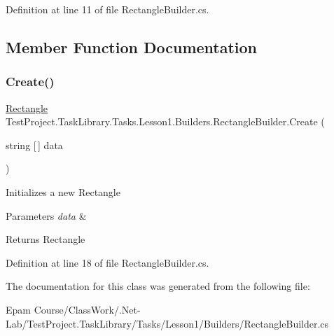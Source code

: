 Definition at line 11 of file Rectangle\+Builder.\+cs.



\subsection{Member Function Documentation}
\mbox{\label{class_test_project_1_1_task_library_1_1_tasks_1_1_lesson1_1_1_builders_1_1_rectangle_builder_af15f46e36e73a3d2f718ceb2856a2377}} 
\subsubsection{\texorpdfstring{Create()}{Create()}}
{\footnotesize\ttfamily \mbox{\hyperlink{class_test_project_1_1_task_library_1_1_tasks_1_1_lesson1_1_1_models_1_1_rectangle}{Rectangle}} Test\+Project.\+Task\+Library.\+Tasks.\+Lesson1.\+Builders.\+Rectangle\+Builder.\+Create (\begin{DoxyParamCaption}\item[{string \mbox{[}$\,$\mbox{]}}]{data }\end{DoxyParamCaption})}



Initializes a new Rectangle 


\begin{DoxyParams}{Parameters}
{\em data} & \\
\hline
\end{DoxyParams}
\begin{DoxyReturn}{Returns}
Rectangle
\end{DoxyReturn}


Definition at line 18 of file Rectangle\+Builder.\+cs.



The documentation for this class was generated from the following file\+:\begin{DoxyCompactItemize}
\item 
Epam Course/\+Class\+Work/.\+Net-\/\+Lab/\+Test\+Project.\+Task\+Library/\+Tasks/\+Lesson1/\+Builders/Rectangle\+Builder.\+cs\end{DoxyCompactItemize}
